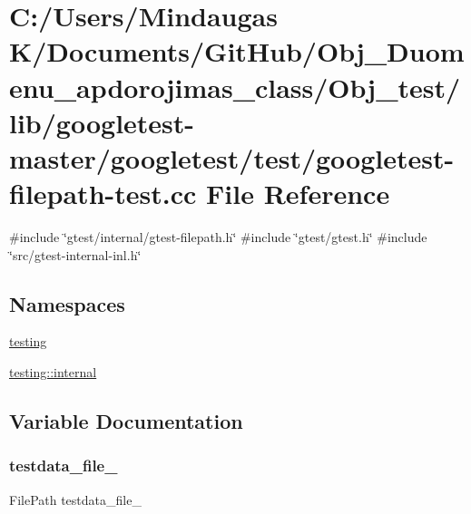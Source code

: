 \hypertarget{_obj__test_2lib_2googletest-master_2googletest_2test_2googletest-filepath-test_8cc}{}\section{C\+:/\+Users/\+Mindaugas K/\+Documents/\+Git\+Hub/\+Obj\+\_\+\+Duomenu\+\_\+apdorojimas\+\_\+class/\+Obj\+\_\+test/lib/googletest-\/master/googletest/test/googletest-\/filepath-\/test.cc File Reference}
\label{_obj__test_2lib_2googletest-master_2googletest_2test_2googletest-filepath-test_8cc}
{\ttfamily \#include \char`\"{}gtest/internal/gtest-\/filepath.\+h\char`\"{}}\newline
{\ttfamily \#include \char`\"{}gtest/gtest.\+h\char`\"{}}\newline
{\ttfamily \#include \char`\"{}src/gtest-\/internal-\/inl.\+h\char`\"{}}\newline
\subsection*{Namespaces}
\begin{DoxyCompactItemize}
\item 
 \mbox{\hyperlink{namespacetesting}{testing}}
\item 
 \mbox{\hyperlink{namespacetesting_1_1internal}{testing\+::internal}}
\end{DoxyCompactItemize}


\subsection{Variable Documentation}
\mbox{\label{_obj__test_2lib_2googletest-master_2googletest_2test_2googletest-filepath-test_8cc_ab25205b360de0f1648175ccbc1cc4365}} 
\subsubsection{\texorpdfstring{testdata\_file\_}{testdata\_file\_}}
{\footnotesize\ttfamily File\+Path testdata\+\_\+file\+\_\+\hspace{0.3cm}{\ttfamily [protected]}}

